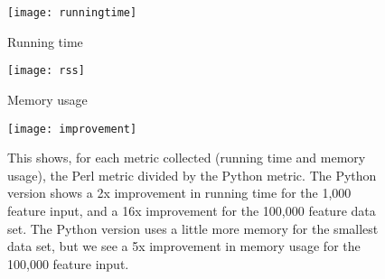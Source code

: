 \documentclass[10pt]{report}
\begin{document}
\begin{figure}
  \texttt{[image: runningtime]}  
  \caption{Running time}
\end{figure}

\begin{figure}
  \texttt{[image: rss]}  
  \caption{Memory usage}
\end{figure}


\begin{figure}
  \texttt{[image: improvement]}  
  \caption{This shows, for each metric collected (running time and
    memory usage), the Perl metric divided by the Python metric. The Python version shows a 2x improvement in running time for the 1,000 feature input, and a 16x improvement for the 100,000 feature data set. The Python version uses a little more memory for the smallest data set, but we see a 5x improvement in memory usage for the 100,000 feature input.}
  
\end{figure}
\end{document}
